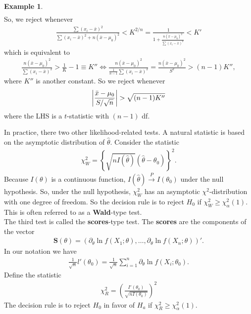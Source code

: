 \documentclass{book}
\theoremstyle{definition}
\newtheorem{exmp}{Example}[section]
\newcommand{\p}{\partial}
\newcommand{\al}{\alpha}
\newcommand{\f}[2]{\frac{#1}{#2}}
\newcommand{\lp}{\left(}
\newcommand{\rp}{\right)}
\newcommand{\lc}{\left\{}
\newcommand{\rc}{\right\}}
\begin{document}
\begin{exmp}
\begin{align}
	\end{align}
	So, we reject whenever
	\begin{align}
	\f{\sum(x_i - \bar{x})^2}{\sum (x_i - \bar{x})^2 + n(\bar{x} - \mu_0)^2} < K^{2/n} = \f{1}{1 + \f{n(\bar{x} - \mu_0)^2}{\sum (x_i - \bar{x})^2}} <  K'
	\end{align}
	which is equivalent to 
	\begin{align}
	\f{n (\bar{x}- \mu_0)^2}{\sum (x_i - \bar{x})^2} > \f{1}{K} - 1 \equiv K'' \iff \f{n (\bar{x}- \mu_0)^2}{\f{1}{n-1}\sum (x_i - \bar{x})^2} =  \f{n (\bar{x}- \mu_0)^2}{S^2}> (n-1)K'',
	\end{align}
	where $K''$ is another constant. So we reject whenever
	\begin{align}
	\abs{\f{\bar{x} - \mu_0}{S/\sqrt{n}}} > \sqrt{(n-1)K''}
	\end{align}
	where the LHS is a $t$-statistic with $(n-1)$ df.
	
\end{exmp}





In practice, there two other likelihood-related tests. A natural statistic is based on the asymptotic distribution of $\hat\theta$. Consider the statistic
\begin{align}
\chi^2_W = \lc \sqrt{nI (\hat\theta)} (\hat\theta - \theta_0) \rc^2.
\end{align}
Because $I(\theta)$ is a continuous function, $I(\hat\theta) \xrightarrow{P} I(\theta_0)$ under the null hypothesis. So, under the null hypothesis, $\chi_W^2$ has an asymptotic $\chi^2$-distribution with one degree of freedom. So the decision rule is to reject $H_0$ if $\chi^2_W \geq \chi^2_\al(1)$. This is often referred to as a \textbf{Wald}-type test. \\

The third test is called the \textbf{scores}-type test. The \textbf{scores} are the components of the vector
\begin{align}
\mathbf{S}(\theta) = \lp \p_\theta \ln f(X_1;\theta), \dots, \p_\theta \ln f(X_n;\theta) \rp'.
\end{align}
In our notation we have
\begin{align}
\f{1}{\sqrt{n}} l'(\theta_0) = \f{1}{\sqrt{n}} \sum^n_{i=1}\p_\theta \ln f(X_i; \theta_0).
\end{align}
Define the statistic
\begin{align}
\chi^2_R = \lp \f{I'(\theta_0)}{\sqrt{n I(\theta_0)}} \rp^2
\end{align}
The decision rule is to reject $H_0$ in favor of $H_a$ if $\chi^2_R \geq \chi^2_\al(1)$.
\end{document}
